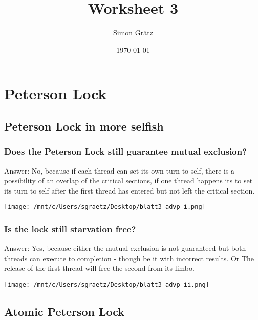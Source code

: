 \documentclass[11pt]{article}
\author{Simon Grätz}
\date{\today}
\title{Worksheet 3}
\begin{document}
\maketitle
\tableofcontents

\section{Peterson Lock}
\label{sec:orgc5a50c0}
\subsection{Peterson Lock in more selfish}
\label{sec:org7ef2451}
\subsubsection{Does the Peterson Lock still guarantee mutual exclusion?}
\label{sec:org40f398a}

Answer: No, because if each thread can set its own turn to self,
there is a possibility of an overlap of the critical sections, if
one thread happens its to set its turn to self after the first
thread has entered but not left the critical section.

\begin{center}
\texttt{[image: /mnt/c/Users/sgraetz/Desktop/blatt3\_advp\_i.png]}
\end{center}
\subsubsection{Is the lock still starvation free?}
\label{sec:orgc0a36a8}
Answer: Yes, because either the mutual exclusion is not guaranteed
but both threads can execute to completion - though be it with
incorrect results. Or The release of the first thread will free
the second from its limbo. 

\begin{center}
\texttt{[image: /mnt/c/Users/sgraetz/Desktop/blatt3\_advp\_ii.png]}
\end{center}
\newpage
\subsection{Atomic Peterson Lock}
\label{sec:orgde4c298}
\end{document}
